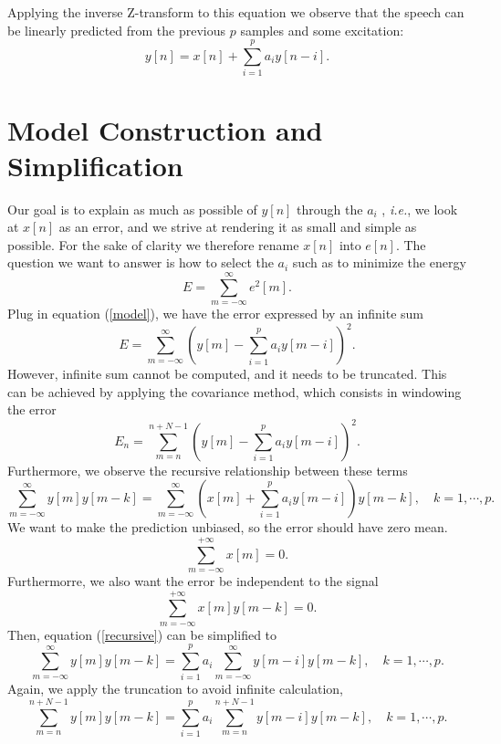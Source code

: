 Applying the inverse Z-transform to this equation we observe that the speech can be linearly predicted from the previous $p$ samples and some excitation:
\begin{equation}\label{model}
y[n] = x[n]+\sum_{i=1}^p a_i y[n-i].
\end{equation}\cite{cc12}


\section{Model Construction and Simplification}
Our goal is to explain as much as possible of \(y[n]\) through the $a_i$ , \textit{i.e.}, we look at \(x[n]\) as an error, and we strive at rendering it as small and simple as possible.
For the sake of clarity we therefore rename \(x[n]\) into \(e[n]\).
The question we want to answer is how to select the $a_i$ such as to minimize the energy
\begin{equation}
E=\sum_{m=-\infty}^\infty e^2[m].
\end{equation}
Plug in equation (\ref{model}), we have the error expressed by an infinite sum
\[ E= \sum_{m=-\infty}^\infty \left(y[m]-\sum_{i=1}^p a_i y[m-i] \right)^2. \]
However, infinite sum cannot be computed, and it needs to be truncated.
This can be achieved by applying the covariance method, which consists in windowing the error
\begin{equation}
E_n=\sum_{m=n}^{n+N-1}\left(y[m]-\sum_{i=1}^p a_i y[m-i] \right)^2.
\end{equation}
Furthermore, we observe the recursive relationship between these terms
\begin{equation}\label{recursive}
	\sum_{m=-\infty}^{\infty} y[m]y[m-k]=\sum_{m=-\infty}^{\infty} \left(x[m]+ \sum_{i=1}^p a_iy[m-i]\right)y[m-k], \quad k=1,\cdots,p.
\end{equation}
We want to make the prediction unbiased, so the error should have zero mean.
\[ \sum_{m=-\infty}^{+\infty}x[m]=0. \]
Furthermorre, we also want the error be independent to the signal
\[ \sum_{m=-\infty}^{+\infty}x[m]y[m-k]=0. \]
Then, equation (\ref{recursive}) can be simplified to
\begin{equation}
\sum_{m=-\infty}^{\infty} y[m]y[m-k]=\sum_{i=1}^p a_i\sum_{m=-\infty}^{\infty} y[m-i]y[m-k], \quad k=1,\cdots,p.
\end{equation}
Again, we apply the truncation to avoid infinite calculation,
\begin{equation}\label{simple}
\sum_{m=n}^{n+N-1} y[m]y[m-k]=\sum_{i=1}^p a_i\sum_{m=n}^{n+N-1} y[m-i]y[m-k], \quad k=1,\cdots,p.
\end{equation}

